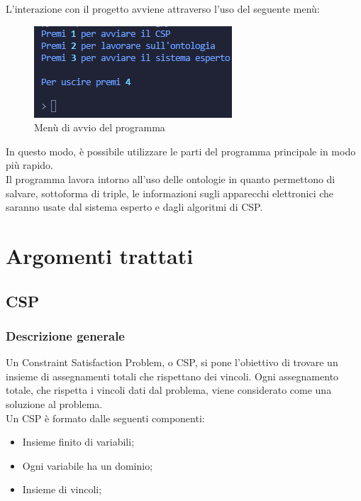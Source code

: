 \documentclass[12pt, letterpaper]{article}
\begin{document}
\noindent L'interazione con il progetto avviene attraverso l'uso del seguente menù:

\begin{figure}[h]
      \centering
      \includegraphics{menu-iniziale.png}
      \caption{Menù di avvio del programma}
\end{figure}

\noindent In questo modo, è possibile utilizzare le parti del programma principale in modo più rapido. \\

\noindent Il programma lavora intorno all'uso delle ontologie in quanto permettono di salvare, sottoforma di triple,
le informazioni sugli apparecchi elettronici che saranno usate dal sistema esperto e dagli algoritmi di CSP.

\section{Argomenti trattati}

\subsection{CSP}

\subsubsection{Descrizione generale}

Un Constraint Satisfaction Problem, o CSP, si pone l'obiettivo di trovare un insieme di assegnamenti totali che
rispettano dei vincoli. Ogni assegnamento totale, che rispetta i vincoli dati dal problema,  viene considerato come
una soluzione al problema. \\

\noindent Un CSP è formato dalle seguenti componenti:
\begin{itemize}
      \item Insieme finito di variabili;
      \item Ogni variabile ha un dominio;
      \item Insieme di vincoli;
\end{itemize}
\end{document}
